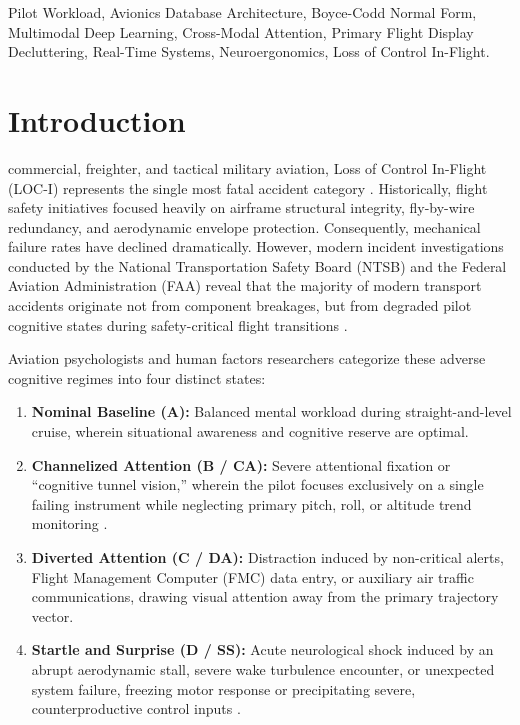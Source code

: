 \documentclass[journal]{IEEEtran}
\begin{document}
\begin{IEEEkeywords}
Pilot Workload, Avionics Database Architecture, Boyce-Codd Normal Form, Multimodal Deep Learning, Cross-Modal Attention, Primary Flight Display Decluttering, Real-Time Systems, Neuroergonomics, Loss of Control In-Flight.
\end{IEEEkeywords}

\IEEEpeerreviewmaketitle

\section{Introduction}
 commercial, freighter, and tactical military aviation, Loss of Control In-Flight (LOC-I) represents the single most fatal accident category \cite{faasafety2020loc, ntsb2014asiana}. Historically, flight safety initiatives focused heavily on airframe structural integrity, fly-by-wire redundancy, and aerodynamic envelope protection. Consequently, mechanical failure rates have declined dramatically. However, modern incident investigations conducted by the National Transportation Safety Board (NTSB) and the Federal Aviation Administration (FAA) reveal that the majority of modern transport accidents originate not from component breakages, but from degraded pilot cognitive states during safety-critical flight transitions \cite{dehais2020neuroergonomics, wickens2008multiple}.

Aviation psychologists and human factors researchers categorize these adverse cognitive regimes into four distinct states:
\begin{enumerate}
    \item \textbf{Nominal Baseline (A):} Balanced mental workload during straight-and-level cruise, wherein situational awareness and cognitive reserve are optimal.
    \item \textbf{Channelized Attention (B / CA):} Severe attentional fixation or ``cognitive tunnel vision,'' wherein the pilot focuses exclusively on a single failing instrument while neglecting primary pitch, roll, or altitude trend monitoring \cite{endsley1995toward}.
    \item \textbf{Diverted Attention (C / DA):} Distraction induced by non-critical alerts, Flight Management Computer (FMC) data entry, or auxiliary air traffic communications, drawing visual attention away from the primary trajectory vector.
    \item \textbf{Startle and Surprise (D / SS):} Acute neurological shock induced by an abrupt aerodynamic stall, severe wake turbulence encounter, or unexpected system failure, freezing motor response or precipitating severe, counterproductive control inputs \cite{sensors_a320_2024}.
\end{enumerate}
\end{document}
